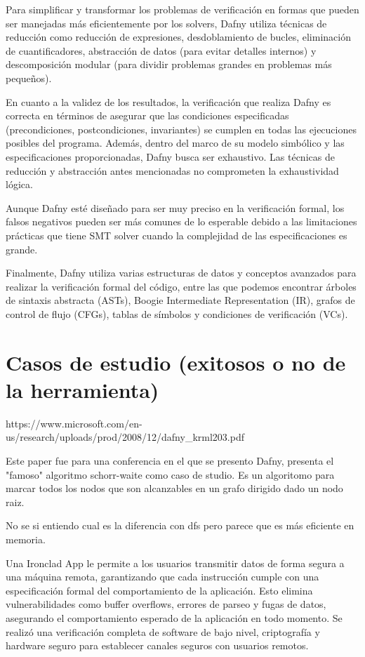\documentclass[runningheads]{llncs}
\begin{document}
Para simplificar y transformar los problemas de verificación en formas que pueden ser manejadas más eficientemente por los solvers, 
Dafny utiliza técnicas de reducción como reducción de expresiones, desdoblamiento de bucles, eliminación de cuantificadores,
abstracción de datos (para evitar detalles internos) y descomposición modular (para dividir problemas grandes en problemas más pequeños).

En cuanto a la validez de los resultados, la verificación que realiza Dafny es correcta en términos de asegurar que las condiciones
especificadas (precondiciones, postcondiciones, invariantes) se cumplen en todas las ejecuciones posibles del programa. 
Además, dentro del marco de su modelo simbólico y las especificaciones proporcionadas,
Dafny busca ser exhaustivo. Las técnicas de reducción y abstracción antes mencionadas no comprometen la exhaustividad lógica.

Aunque Dafny esté diseñado para ser muy preciso en la verificación formal, 
los falsos negativos pueden ser más comunes de lo esperable debido a las limitaciones prácticas que tiene SMT solver
cuando la complejidad de las especificaciones es grande.

Finalmente, Dafny utiliza varias estructuras de datos y conceptos avanzados para realizar la verificación formal del código,
entre las que podemos encontrar árboles de sintaxis abstracta (ASTs), Boogie Intermediate Representation (IR), grafos de control de flujo (CFGs),
tablas de símbolos y condiciones de verificación (VCs).

\section{Casos de estudio (exitosos o no de la herramienta)}

https://www.microsoft.com/en-us/research/uploads/prod/2008/12/dafny\_krml203.pdf

Este paper fue para una conferencia en el que se presento Dafny, presenta el "famoso" algoritmo schorr-waite como caso de studio. Es un algoritomo para marcar todos los nodos que son alcanzables en un grafo dirigido dado un nodo raiz.

No se si entiendo cual es la diferencia con dfs pero parece que es más eficiente en memoria.

Una Ironclad\cite{hawblitzel2014ironclad} App le permite a los usuarios transmitir datos de forma segura a una máquina remota, garantizando que cada instrucción cumple con una especificación formal del comportamiento de la aplicación. Esto elimina vulnerabilidades como buffer overflows, errores de parseo y fugas de datos, asegurando el comportamiento esperado de la aplicación en todo momento. Se realizó una verificación completa de software de bajo nivel, criptografía y hardware seguro para establecer canales seguros con usuarios remotos.
\end{document}
